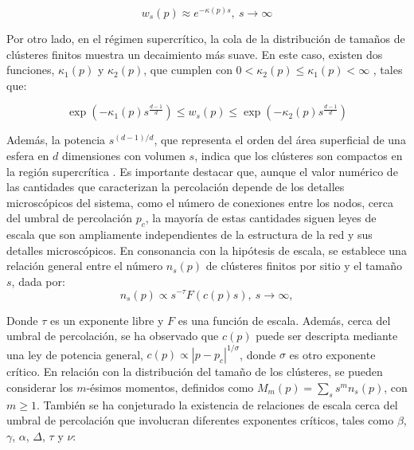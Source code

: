 \begin{equation}\label{eq:20}
w_s(p) \approx e^{-\kappa(p)s}, \ s\to\infty
\end{equation}

Por otro lado, en el régimen supercrítico, la cola de la distribución de tamaños de clústeres finitos muestra un decaimiento más suave. En este caso, existen dos funciones,  $\kappa_1(p)$  y $\kappa_2 (p)$, que cumplen con $0 < \kappa_2(p) \leq  \kappa_1(p) < \infty$ \cite{grimmett_percolation_2013}, tales que:

\begin{equation}\label{eq:21}
	\exp{\left(-\kappa_1(p)s^{\frac{d-1}{d}}\right)} \leq w_s(p) \leq \exp{\left(-\kappa_2(p)s^{\frac{d-1}{d}}\right)}
\end{equation}

Además, la potencia $s^{(d-1)/d}$, que representa el orden del área superficial de una esfera en $d$ dimensiones con volumen $s$, indica que los clústeres son compactos en la región supercrítica \cite{djordjevic_scaling_1987}. Es importante destacar que, aunque el valor numérico de las cantidades que caracterizan la percolación depende de los detalles microscópicos del sistema, como el número de conexiones entre los nodos, cerca del umbral de percolación $p_c$, la mayoría de estas cantidades siguen leyes de escala que son ampliamente independientes de la estructura de la red y sus detalles microscópicos. En consonancia con la hipótesis de escala, se establece una relación general entre el número $n_s(p)$ de clústeres finitos por sitio y el tamaño $s$, dada por:
\begin{equation}\label{eq:22}
	n_s(p)  \propto s^{-\tau}F\left(c(p)s\right), \ s\to\infty,
\end{equation}

Donde $\tau$ es un exponente libre y $F$ es una función de escala.  Además, cerca del umbral de percolación, se ha observado que  $c(p)$ puede ser descripta mediante una ley de potencia general, $c (p) \propto \left|p-p_c \right|^{1/\sigma}$, donde $\sigma$ es otro exponente crítico.  En relación con la distribución del tamaño de los clústeres, se pueden considerar los $m$-ésimos momentos, definidos como $M_m(p) = \sum_{s}s^mn_s(p)$, con $m \geq 1$. También se ha conjeturado la existencia de relaciones de escala cerca del umbral de percolación que involucran diferentes exponentes críticos, tales como $\beta$, $\gamma$, $\alpha$, $\Delta$,  $\tau$ y $\nu$:


